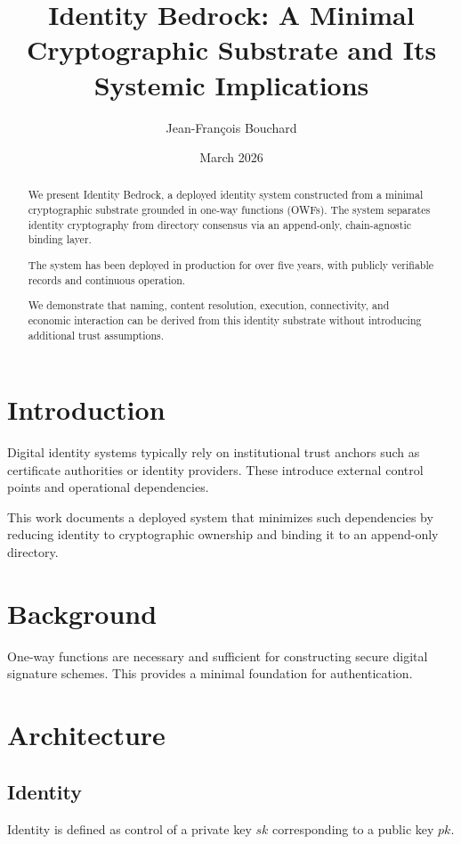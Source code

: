 \documentclass[11pt,a4paper]{article}
\title{\textbf{Identity Bedrock: A Minimal Cryptographic Substrate and Its Systemic Implications}}
\author{Jean-François Bouchard}
\date{March 2026}
\begin{document}
\maketitle

\begin{abstract}
We present Identity Bedrock, a deployed identity system constructed from a minimal cryptographic substrate grounded in one-way functions (OWFs). The system separates identity cryptography from directory consensus via an append-only, chain-agnostic binding layer.

The system has been deployed in production for over five years, with publicly verifiable records and continuous operation.

We demonstrate that naming, content resolution, execution, connectivity, and economic interaction can be derived from this identity substrate without introducing additional trust assumptions.
\end{abstract}

\section{Introduction}

Digital identity systems typically rely on institutional trust anchors such as certificate authorities or identity providers. These introduce external control points and operational dependencies.

This work documents a deployed system that minimizes such dependencies by reducing identity to cryptographic ownership and binding it to an append-only directory.

\section{Background}

One-way functions are necessary and sufficient for constructing secure digital signature schemes. This provides a minimal foundation for authentication.

\section{Architecture}

\subsection{Identity}

Identity is defined as control of a private key $sk$ corresponding to a public key $pk$.
\end{document}

